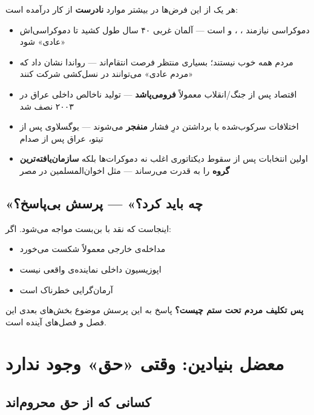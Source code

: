 \begin{tcolorbox}[failbox, title={واقعیت تلخ}]
هر یک از این فرض‌ها در بیشتر موارد \textbf{نادرست} از کار درآمده است:
\begin{itemize}
\item دموکراسی نیازمند ، ،
و  است — آلمان غربی ۴۰ سال طول کشید تا دموکراسی‌اش
«عادی» شود
\item مردم همه خوب نیستند؛ بسیاری منتظر فرصت انتقام‌اند — رواندا نشان
داد که «مردم عادی» می‌توانند در نسل‌کشی شرکت کنند
\item اقتصاد پس از جنگ/انقلاب معمولاً \textbf{فرومی‌پاشد} — تولید
ناخالص داخلی عراق در ۲۰۰۳ نصف شد
\item اختلافات سرکوب‌شده با برداشتن درِ فشار \textbf{منفجر}
می‌شوند — یوگسلاوی پس از تیتو، عراق پس از صدام
\item اولین انتخابات پس از سقوط دیکتاتوری اغلب نه دموکرات‌ها بلکه
\textbf{سازمان‌یافته‌ترین گروه} را به قدرت می‌رساند — مثل اخوان‌المسلمین
در مصر
\end{itemize}
\end{tcolorbox}


\subsection{«چه باید کرد؟» — پرسش بی‌پاسخ؟}

اینجاست که نقد با بن‌بست مواجه می‌شود. اگر:
\begin{itemize}
\item مداخله‌ی خارجی معمولاً شکست می‌خورد
\item اپوزیسیون داخلی نماینده‌ی واقعی نیست
\item آرمان‌گرایی خطرناک است
\end{itemize}

\textbf{پس تکلیف مردم تحت ستم چیست؟}  پاسخ به این پرسش موضوع بخش‌های
بعدی این فصل و فصل‌های آینده است.


\section{معضل بنیادین: وقتی «حق» وجود ندارد}
\label{sec:ch15-no-rights}

\subsection{کسانی که از حق محروم‌اند}


